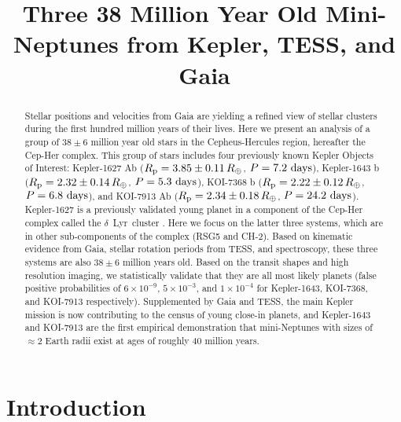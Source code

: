 \documentclass[12pt,modern,tighten]{aastex63}
\begin{document}
\title{
  Three 38 Million Year Old Mini-Neptunes from Kepler, TESS, and Gaia
}



\begin{abstract}
  Stellar positions and velocities from Gaia
  are yielding a refined view of stellar clusters during the
  first hundred million years of their lives.
  Here we present an analysis of a group of $38 \pm 6$ million year old stars
  in the Cepheus-Hercules region, hereafter the Cep-Her complex.
  This group of stars includes four previously known Kepler Objects of
  Interest:
  Kepler-1627 Ab ($R_{\rm p} = 3.85 \pm 0.11\,R_\oplus$, $P = 7.2\ {\rm days}$),
  Kepler-1643 b ($R_{\rm p} = 2.32 \pm 0.14\,R_\oplus$, $P = 5.3\ {\rm days}$),
  KOI-7368 b ($R_{\rm p} = 2.22 \pm 0.12\,R_\oplus$, $P = 6.8\ {\rm days}$), and
  KOI-7913 Ab ($R_{\rm p} = 2.34 \pm 0.18\,R_\oplus$, $P = 24.2\ {\rm days}$).
	Kepler-1627 is a previously validated young planet
	in a component of the Cep-Her complex called the $\delta$\ Lyr\ cluster \citep{bouma_kep1627_2022}.
	Here we focus on the latter three systems, which are in other sub-components
	of the complex (RSG5 and CH-2).
	Based on kinematic evidence from Gaia, stellar rotation periods from TESS, and spectroscopy,
	these three systems are also $38 \pm 6$ million years old.
	Based on the transit shapes and high resolution imaging, we
	statistically validate that they are all most likely planets (false positive probabilities of $6\times10^{-9}$,
	$5\times10^{-3}$, and $1\times10^{-4}$ for Kepler-1643, KOI-7368, and
	KOI-7913 respectively).
	Supplemented by Gaia and TESS, the main Kepler mission is now contributing to the
	census of young close-in planets, and Kepler-1643 and KOI-7913 are the first
	empirical demonstration that mini-Neptunes with sizes of $\approx$2 Earth radii
	exist at ages of roughly 40 million years.
\end{abstract}





\section{Introduction}
\end{document}
